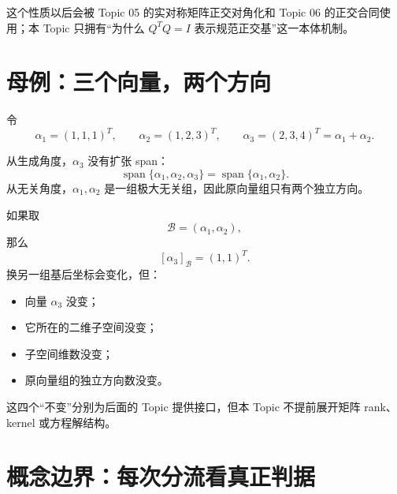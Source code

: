 \documentclass[11pt,a4paper]{ctexart}
\begin{document}
这个性质以后会被 Topic 05 的实对称矩阵正交对角化和 Topic 06 的正交合同使用；本 Topic 只拥有“为什么 $Q^TQ=I$ 表示规范正交基”这一本体机制。

\section{母例：三个向量，两个方向}

令
\[
\alpha_1=(1,1,1)^T,\qquad
\alpha_2=(1,2,3)^T,\qquad
\alpha_3=(2,3,4)^T=\alpha_1+\alpha_2.
\]

从生成角度，$\alpha_3$ 没有扩张 span：
\[
\operatorname{span}\{\alpha_1,\alpha_2,\alpha_3\}
=\operatorname{span}\{\alpha_1,\alpha_2\}.
\]
从无关角度，$\alpha_1,\alpha_2$ 是一组极大无关组，因此原向量组只有两个独立方向。

如果取
\[
\mathcal B=(\alpha_1,\alpha_2),
\]
那么
\[
[\alpha_3]_{\mathcal B}=(1,1)^T.
\]
换另一组基后坐标会变化，但：

\begin{itemize}
  \item 向量 $\alpha_3$ 没变；
  \item 它所在的二维子空间没变；
  \item 子空间维数没变；
  \item 原向量组的独立方向数没变。
\end{itemize}

这四个“不变”分别为后面的 Topic 提供接口，但本 Topic 不提前展开矩阵 rank、kernel 或方程解结构。

\section{概念边界：每次分流看真正判据}
\end{document}
